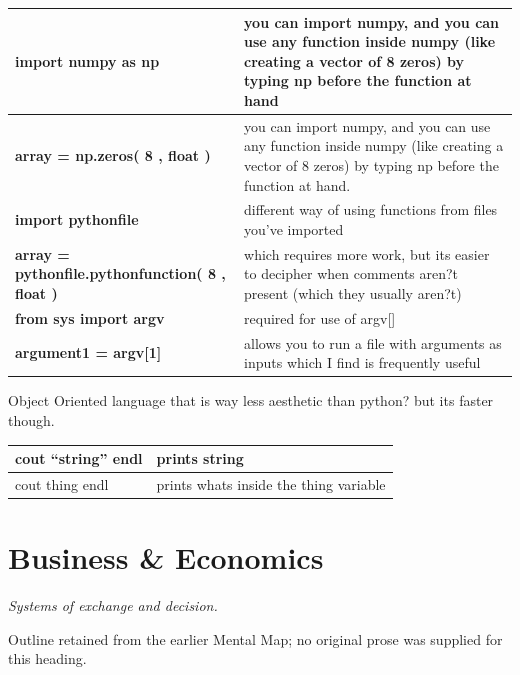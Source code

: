 \documentclass{article}
\newcounter{subsubsubsection}[subsubsection]
\begin{document}
\begin{center}
\begin{tabular*}{\textwidth}{ | p{} | p{}| }
\hline
\textbf{import numpy as np} & you can import numpy, and you can use any function inside numpy (like creating a vector of 8 zeros) by typing np before the function at hand \\ 
\hline 
\textbf{array = np.zeros( 8 , float )} & you can import numpy, and you can use any function inside numpy (like creating a vector of 8 zeros) by typing np before the function at hand. \\ 
\hline
\textbf{import pythonfile} & different way of using functions from files you've imported \\
\hline 
\textbf{array = pythonfile.pythonfunction( 8 , float )} & which requires more work, but its easier to decipher when comments aren?t present (which they usually aren?t) \\ 
\hline 
\textbf{from sys import argv} & required for use of argv[]\\
\hline 
\textbf{argument1 = argv[1]} & allows you to run a file with arguments as inputs which I find is frequently useful \\
\hline
\end{tabular*}
\end{center}

Object Oriented language that is way less aesthetic than python? but its faster though. 

\begin{center}
\begin{tabular*}{\textwidth}{ | p{} | p{}| }
\hline
cout ``string'' endl & prints string \\ 
\hline 
cout thing endl & prints whats inside the thing variable \\
\hline
\end{tabular*}
\end{center}

\section{Business \& Economics}\label{sec:business-and-economics}
\textit{Systems of exchange and decision.}

Outline retained from the earlier Mental Map; no original prose was supplied for this heading.

\end{document}
